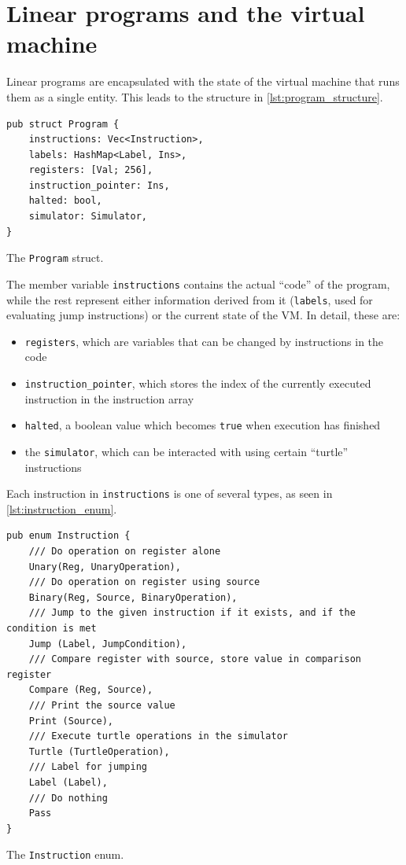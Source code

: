 \documentclass{report}
\newenvironment{code}{\captionsetup{type=listing}}{}
\begin{document}
\section{Linear programs and the virtual machine}
Linear programs are encapsulated with the state of the virtual machine that runs them as a single entity. This leads to the structure in \autoref{lst:program_structure}.

\begin{code}
    \begin{verbatim}
pub struct Program {
    instructions: Vec<Instruction>,
    labels: HashMap<Label, Ins>,
    registers: [Val; 256],
    instruction_pointer: Ins,
    halted: bool,
    simulator: Simulator,
}
    \end{verbatim}
    \caption{The \texttt{Program} struct.}
    \label{lst:program_structure}
\end{code}

The member variable \verb|instructions| contains the actual ``code'' of the program, while the rest represent either information derived from it (\verb|labels|, used for evaluating jump instructions) or the current state of the VM. In detail, these are:

\begin{itemize}
    \item \verb|registers|, which are variables that can be changed by instructions in the code
    \item \verb|instruction_pointer|, which stores the index of the currently executed instruction in the instruction array
    \item \verb|halted|, a boolean value which becomes \verb|true| when execution has finished
    \item the \verb|simulator|, which can be interacted with using certain ``turtle'' instructions
\end{itemize}

Each instruction in \verb|instructions| is one of several types, as seen in \autoref{lst:instruction_enum}.

\begin{code}
    \begin{verbatim}
pub enum Instruction {
    /// Do operation on register alone
    Unary(Reg, UnaryOperation),
    /// Do operation on register using source
    Binary(Reg, Source, BinaryOperation),
    /// Jump to the given instruction if it exists, and if the condition is met
    Jump (Label, JumpCondition),
    /// Compare register with source, store value in comparison register
    Compare (Reg, Source),
    /// Print the source value
    Print (Source),
    /// Execute turtle operations in the simulator
    Turtle (TurtleOperation),
    /// Label for jumping
    Label (Label),
    /// Do nothing
    Pass
}
    \end{verbatim}
    \caption{The \texttt{Instruction} enum.}
    \label{lst:instruction_enum}
\end{code}
\end{document}
